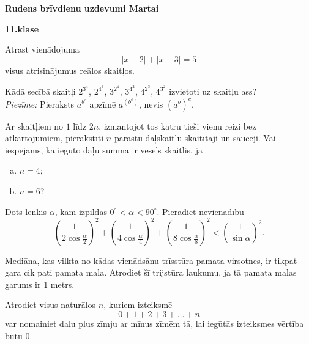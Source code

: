 \documentclass[11pt]{article}
\begin{document}
\begin{center}
{\Large \bf Rudens brīvdienu uzdevumi Martai}
\end{center}

\vspace{10pt}
{\bf \large 11.klase}

\begin{problem}
Atrast vienādojuma
$$|x - 2| + |x - 3| = 5$$
visus atrisinājumus reālos skaitļos.
\end{problem}

\begin{problem}
Kādā secībā skaitļi 
${\displaystyle 2^{3^4}}$, ${\displaystyle 2^{4^3}}$, 
${\displaystyle 3^{2^4}}$, ${\displaystyle 3^{4^2}}$, 
${\displaystyle 4^{2^3}}$, ${\displaystyle 4^{3^2}}$ 
izvietoti uz skaitļu ass?\\
{\em Piezīme:} Pieraksts ${\displaystyle a^{b^c}}$
apzīmē ${\displaystyle a^{\left( b^c \right)}}$, nevis 
${\displaystyle \left( a^b \right)^c}$.
\end{problem}

\begin{problem}
Ar skaitļiem no $1$ līdz $2n$, izmantojot tos katru 
tieši vienu reizi bez atkārtojumiem, 
pierakstīti $n$ parastu daļskaitļu skaitītāji un saucēji. 
Vai iespējams, ka iegūto daļu summa ir
vesels skaitlis, ja
\begin{enumerate}[(a)]
\item $n = 4$;
\item $n = 6$?
\end{enumerate}
\end{problem}

\begin{problem}
Dots leņkis $\alpha$, kam izpildās $0^{\circ} < \alpha < 90^{\circ}$. 
Pierādiet nevienādību
$$\left( \frac{1}{2\cos \frac{\alpha}{2}} \right)^2 + 
\left( \frac{1}{4\cos \frac{\alpha}{4}} \right)^2 + 
\left( \frac{1}{8\cos \frac{\alpha}{8}} \right)^2 <
\left( \frac{1}{\sin \alpha} \right)^2.$$
\end{problem}

\begin{problem}
Mediāna, kas vilkta no kādas vienādsānu trīsstūra pamata virsotnes,
ir tikpat gara cik pati pamata mala. 
Atrodiet šī trijstūra laukumu, 
ja tā pamata malas garums ir 1 metrs.
\end{problem}



\begin{problem}
Atrodiet visus naturālos $n$, kuriem izteiksmē
$$0 + 1 + 2 + 3 + \ldots + n$$
var nomainiet daļu plus zīmju ar mīnus zīmēm tā, 
lai iegūtās izteiksmes vērtība būtu $0$.
\end{problem}
\end{document}

